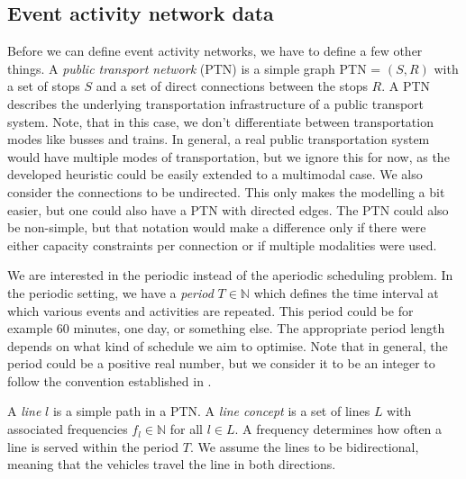 \documentclass[english, 12pt, a4paper, sci, utf8, a-2b, online]{aaltothesis}
\newtheorem{definition}{Definition}
\newcommand{\N}{\mathbb{N}}
\begin{document}
\subsection{Event activity network data}








Before we can define event activity networks, we have to define a few other things. A \textit{public transport network} (PTN) is a simple graph PTN = $(S, R)$ with a set of stops $S$ and a set of direct connections between the stops $R$. A PTN describes the underlying transportation infrastructure of a public transport system. Note, that in this case, we don't differentiate between transportation modes like busses and trains. In general, a real public transportation system would have multiple modes of transportation, but we ignore this for now, as the developed heuristic could be easily extended to a multimodal case. We also consider the connections to be undirected. This only makes the modelling a bit easier, but one could also have a PTN with directed edges. The PTN could also be non-simple, but that notation would make a difference only if there were either capacity constraints per connection or if multiple modalities were used.

We are interested in the periodic instead of the aperiodic scheduling problem. In the periodic setting, we have a \textit{period} $T \in \N$ which defines the time interval at which various events and activities are repeated. This period could be for example 60 minutes, one day, or something else. The appropriate period length depends on what kind of schedule we aim to optimise. Note that in general, the period could be a positive real number, but we consider it to be an integer to follow the convention established in \cite{schiewe2020periodic}.


A \textit{line} $l$ is a simple path in a PTN. A \textit{line concept} is a set of lines $L$ with associated frequencies $f_l \in \N$ for all $l \in L$. A frequency determines how often a line is served within the period $T$. We assume the lines to be bidirectional, meaning that the vehicles travel the line in both directions.
\end{document}

